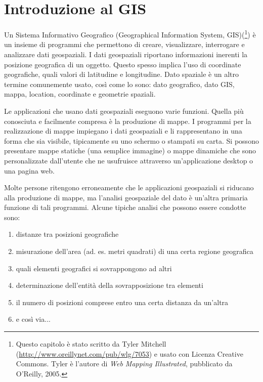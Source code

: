 \pagestyle{scrheadings}
\chapter{Introduzione al GIS}\label{label_intro}


Un Sistema Informativo Geografico (Geographical Information System,
GIS)(\cite{mitchel05}\footnote{Questo capitolo è stato scritto da Tyler
Mitchell (\url{http://www.oreillynet.com/pub/wlg/7053}) e usato con Licenza Creative Commons. Tyler è l'autore di 
\textit{Web Mapping Illustrated}, pubblicato da O'Reilly, 2005.})
è un insieme di programmi che permettono di creare, visualizzare,
interrogare e analizzare dati geospaziali. I dati geospaziali riportano
informazioni inerenti la posizione geografica di un oggetto. Questo
spesso implica l'uso di coordinate geografiche, quali valori di latitudine
e longitudine. Dato spaziale è un altro termine comunemente usato,
così come lo sono: dato geografico, dato GIS, mappa, location,
coordinate e geometrie spaziali.

Le applicazioni che usano dati geospaziali eseguono varie funzioni.
Quella più conosciuta e facilmente compresa è la produzione di mappe.
I programmi per la realizzazione di mappe impiegano i dati geospaziali
e li rappresentano in una forma che sia visibile, tipicamente su uno
schermo o stampati su carta. Si possono presentare mappe statiche
(una semplice immagine) o mappe dinamiche che sono personalizzate
dall'utente che ne usufruisce attraverso un'applicazione desktop o una pagina web.

Molte persone ritengono erroneamente che le applicazioni geospaziali
si riducano alla produzione di mappe, ma l'analisi geospaziale del
dato è un'altra primaria funzione di tali programmi. Alcune tipiche
analisi che possono essere condotte sono:

\begin{enumerate}
\item distanze tra posizioni geografiche
\item misurazione dell'area (ad. es. metri quadrati) di una certa regione
geografica
\item quali elementi geografici si sovrappongono ad altri
\item determinazione dell'entità della sovrapposizione tra elementi
\item il numero di posizioni comprese entro una certa distanza da un'altra
\item e così via... 
\end{enumerate}

